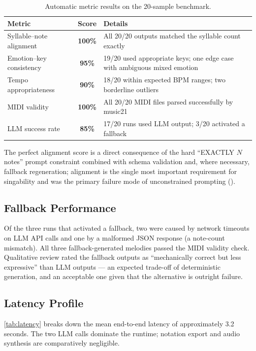 \begin{table}[ht]
\centering
\caption[Automatic metric results]{Automatic metric results on the
20-sample benchmark.}
\label{tab:results}
\begin{tabular}{l c p{5.6cm}}
\toprule
\textbf{Metric} & \textbf{Score} & \textbf{Details} \\
\midrule
Syllable--note alignment & \textbf{100\%} & All 20/20 outputs matched the
syllable count exactly \\
Emotion--key consistency & \textbf{95\%} & 19/20 used appropriate keys; one
edge case with ambiguous mixed emotion \\
Tempo appropriateness & \textbf{90\%} & 18/20 within expected BPM ranges;
two borderline outliers \\
MIDI validity & \textbf{100\%} & All 20/20 MIDI files parsed successfully by
music21 \\
LLM success rate & \textbf{85\%} & 17/20 runs used LLM output; 3/20
activated a fallback \\
\bottomrule
\end{tabular}
\end{table}

The perfect alignment score is a direct consequence of the hard
\enquote{EXACTLY $N$ notes} prompt constraint combined with schema
validation and, where necessary, fallback regeneration; alignment is the
single most important requirement for singability and was the primary
failure mode of unconstrained prompting ().

\subsection{Fallback Performance}

Of the three runs that activated a fallback, two were caused by network
timeouts on LLM API calls and one by a malformed JSON response (a note-count
mismatch). All three fallback-generated melodies passed the MIDI validity
check. Qualitative review rated the fallback outputs as \enquote{mechanically
correct but less expressive} than LLM outputs --- an expected trade-off of
deterministic generation, and an acceptable one given that the alternative
is outright failure.

\subsection{Latency Profile}

\ref{tab:latency} breaks down the mean end-to-end latency of
approximately 3.2 seconds. The two LLM calls dominate the runtime; notation
export and audio synthesis are comparatively negligible.

